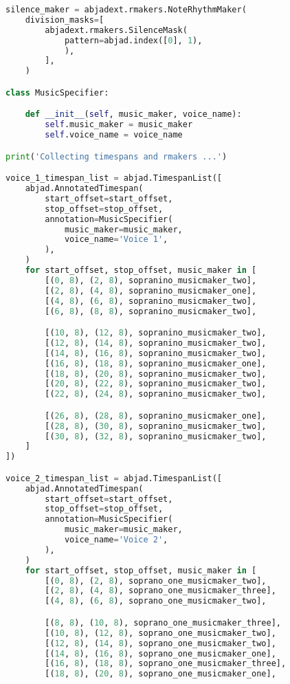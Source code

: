 \begin{lstlisting}[language=Python, caption=Invocation Source Code]
silence_maker = abjadext.rmakers.NoteRhythmMaker(
    division_masks=[
        abjadext.rmakers.SilenceMask(
            pattern=abjad.index([0], 1),
            ),
        ],
    )

class MusicSpecifier:

    def __init__(self, music_maker, voice_name):
        self.music_maker = music_maker
        self.voice_name = voice_name

print('Collecting timespans and rmakers ...')

voice_1_timespan_list = abjad.TimespanList([
    abjad.AnnotatedTimespan(
        start_offset=start_offset,
        stop_offset=stop_offset,
        annotation=MusicSpecifier(
            music_maker=music_maker,
            voice_name='Voice 1',
        ),
    )
    for start_offset, stop_offset, music_maker in [
        [(0, 8), (2, 8), sopranino_musicmaker_two],
        [(2, 8), (4, 8), sopranino_musicmaker_one],
        [(4, 8), (6, 8), sopranino_musicmaker_two],
        [(6, 8), (8, 8), sopranino_musicmaker_two],

        [(10, 8), (12, 8), sopranino_musicmaker_two],
        [(12, 8), (14, 8), sopranino_musicmaker_two],
        [(14, 8), (16, 8), sopranino_musicmaker_two],
        [(16, 8), (18, 8), sopranino_musicmaker_one],
        [(18, 8), (20, 8), sopranino_musicmaker_two],
        [(20, 8), (22, 8), sopranino_musicmaker_two],
        [(22, 8), (24, 8), sopranino_musicmaker_two],

        [(26, 8), (28, 8), sopranino_musicmaker_one],
        [(28, 8), (30, 8), sopranino_musicmaker_two],
        [(30, 8), (32, 8), sopranino_musicmaker_two],
    ]
])

voice_2_timespan_list = abjad.TimespanList([
    abjad.AnnotatedTimespan(
        start_offset=start_offset,
        stop_offset=stop_offset,
        annotation=MusicSpecifier(
            music_maker=music_maker,
            voice_name='Voice 2',
        ),
    )
    for start_offset, stop_offset, music_maker in [
        [(0, 8), (2, 8), soprano_one_musicmaker_two],
        [(2, 8), (4, 8), soprano_one_musicmaker_three],
        [(4, 8), (6, 8), soprano_one_musicmaker_two],

        [(8, 8), (10, 8), soprano_one_musicmaker_three],
        [(10, 8), (12, 8), soprano_one_musicmaker_two],
        [(12, 8), (14, 8), soprano_one_musicmaker_two],
        [(14, 8), (16, 8), soprano_one_musicmaker_one],
        [(16, 8), (18, 8), soprano_one_musicmaker_three],
        [(18, 8), (20, 8), soprano_one_musicmaker_one],


\end{lstlisting}
